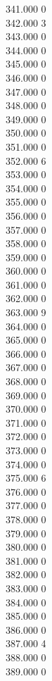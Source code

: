 { 341.000	0 \\
 342.000	3 \\
 343.000	0 \\
 344.000	0 \\
 345.000	0 \\
 346.000	0 \\
 347.000	0 \\
 348.000	0 \\
 349.000	0 \\
 350.000	0 \\
 351.000	0 \\
 352.000	6 \\
 353.000	0 \\
 354.000	0 \\
 355.000	0 \\
 356.000	0 \\
 357.000	0 \\
 358.000	0 \\
 359.000	0 \\
 360.000	0 \\
 361.000	0 \\
 362.000	0 \\
 363.000	9 \\
 364.000	0 \\
 365.000	0 \\
 366.000	0 \\
 367.000	0 \\
 368.000	0 \\
 369.000	0 \\
 370.000	0 \\
 371.000	0 \\
 372.000	0 \\
 373.000	0 \\
 374.000	0 \\
 375.000	6 \\
 376.000	0 \\
 377.000	0 \\
 378.000	0 \\
 379.000	0 \\
 380.000	0 \\
 381.000	0 \\
 382.000	0 \\
 383.000	0 \\
 384.000	0 \\
 385.000	0 \\
 386.000	0 \\
 387.000	4 \\
 388.000	0 \\
 389.000	0 \\
}
